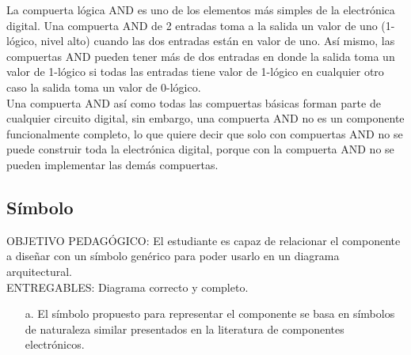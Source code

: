 \normalsize

	La compuerta lógica AND es uno de los elementos más simples de la electrónica digital. Una compuerta AND de 2 entradas toma  a la salida un valor de uno (1-lógico, nivel alto) cuando las dos entradas están en valor de uno. Así mismo, las compuertas AND pueden tener más de dos entradas en donde la salida toma un valor de 1-lógico si todas las entradas tiene valor de 1-lógico en cualquier otro caso la salida toma un valor de 0-lógico. \\
	
	Una compuerta AND así como todas las compuertas básicas forman parte de cualquier circuito digital, sin embargo, una compuerta AND no es un componente funcionalmente completo, lo que quiere decir que solo con compuertas AND no se puede construir toda la electrónica digital, porque con la compuerta AND no se pueden implementar las demás compuertas.\\
\subsection{Símbolo}
\scriptsize
		\begin{tcolorbox}[enhanced,title=PRODUCTO DE CALIDAD:,colframe=colorA1,colback=colorA2,arc=0mm,colbacktitle=white,fonttitle=\bfseries,coltitle=white,attach boxed title to top left={xshift=3.2mm,yshift=-0.50mm},boxed title style={skin=enhancedfirst jigsaw,size=small,arc=0mm,bottom=1mm,interior style={fill=none,top color=color2,bottom color=color2},,boxrule=0pt},boxrule=0pt]
		OBJETIVO PEDAGÓGICO: El estudiante es capaz de relacionar el componente a diseñar con un símbolo genérico para poder usarlo en un diagrama arquitectural.\\
		ENTREGABLES: Diagrama correcto y completo.
		\begin{enumerate}
			\item[a.] El símbolo propuesto para representar el componente se basa en símbolos de naturaleza similar presentados en la literatura de componentes electrónicos.
		\end{enumerate}
	\end{tcolorbox}

\normalsize

